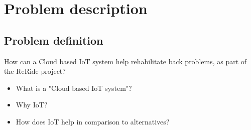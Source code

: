 \section{Problem description}
\subsection{Problem definition}
How can a Cloud based IoT system help rehabilitate back problems, as part of the ReRide project?
\begin{itemize}
	\item What is a "Cloud based IoT system"?
	\item Why IoT?
	\item How does IoT help in comparison to alternatives?
\end{itemize}

